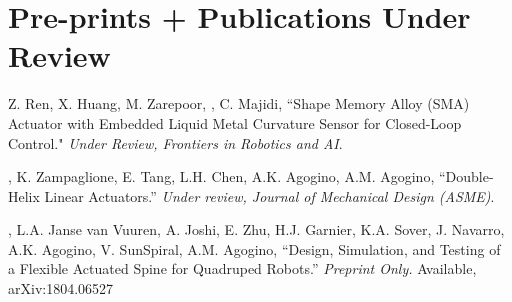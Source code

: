 \documentclass[letterpaper]{deedy-resume} %
\begin{document}
{\section{Pre-prints + Publications Under Review}

\vspace{0.2cm}

\begin{etaremune}[itemsep=0.1cm]

\item Z. Ren, X. Huang, M. Zarepoor, \underline{{}}, C. Majidi, ``Shape Memory Alloy (SMA) Actuator with Embedded Liquid Metal Curvature Sensor for Closed-Loop Control." {\it Under Review, Frontiers in Robotics and AI}.

\item \underline{{}}, K. Zampaglione, E. Tang, L.H. Chen, A.K. Agogino, A.M. Agogino, ``Double-Helix Linear Actuators.'' {\it Under review, Journal of Mechanical Design (ASME)}.

\item \underline{{}}, L.A. Janse van Vuuren, A. Joshi, E. Zhu, H.J. Garnier, K.A. Sover, J. Navarro, A.K. Agogino, V. SunSpiral, A.M. Agogino, ``Design, Simulation, and Testing of a Flexible Actuated Spine for Quadruped Robots.'' {\it Preprint Only.} Available, arXiv:1804.06527 

\end{etaremune}  

%  
%
%
%
%
%  
%
%
%
%

}
\end{document}
